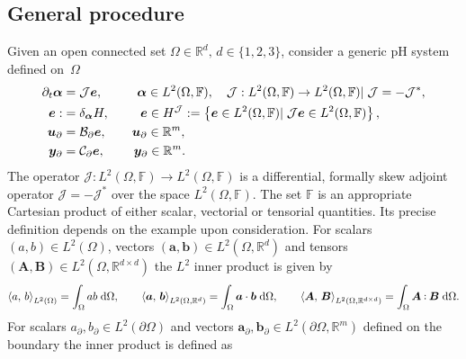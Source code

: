 \subsection{General procedure}\label{sec:pfem_gen}
Given an open connected set $\Omega \in \mathbb{R}^d,\, d \in  \{1,2,3\}$, consider a generic pH system defined on~$\Omega$
\begin{subequations}
\label{eq:pHsys_2}
\begin{align}
\partial_t {\bm{\alpha}} &= \mathcal{J}\displaystyle \bm{e}, \qquad \;\;\, \bm{\alpha} \in L^2(\Omega, \mathbb{F}), \quad \mathcal{J}: L^2(\Omega, \mathbb{F}) \rightarrow L^2(\Omega, \mathbb{F}) \vert \;  \mathcal{J} = - \mathcal{J}^*, \label{eq:pHsys_dyn} \vspace{3pt}\\
\bm{e} :&= \displaystyle \delta_{\bm{\alpha}}H, \qquad \;\, \bm{e} \in H^\mathcal{J} :=\left\{\bm{e} \in L^2(\Omega, \mathbb{F}) \vert \; \mathcal{J}\bm{e} \in L^2(\Omega, \mathbb{F})  \right\}, \label{eq:pHsys_const} \\
\bm{u}_\partial &= \mathcal{B}_\partial  \displaystyle \bm{e}, \qquad \bm{u}_\partial \in \mathbb{R}^m, \label{eq:pHsys_u} \vspace{3pt}\\
\bm{y}_\partial &= \mathcal{C}_\partial \displaystyle \bm{e}, \qquad \; \bm{y}_\partial \in \mathbb{R}^m. \label{eq:pHsys_y} \vspace{3pt}
\end{align}
\end{subequations}
The operator $\mathcal{J}: L^2(\Omega, \mathbb{F}) \rightarrow L^2(\Omega, \mathbb{F})$ is a differential, formally skew adjoint operator $\mathcal{J} = - \mathcal{J}^*$ over the space $L^2(\Omega, \mathbb{F})$. The  set $\mathbb{F}$ is an appropriate Cartesian product of either scalar, vectorial or tensorial quantities. Its precise definition depends on the example upon consideration. For scalars $(a,b) \in L^2(\Omega)$, vectors $(\bm{a}, \bm{b})\in L^2(\Omega, \mathbb{R}^d)$ and tensors  $(\bm{A}, \bm{B}) \in L^2(\Omega,\mathbb{R}^{d\times d})$ the $L^2$ inner product is given by 
\begin{equation}
\inner[L^2(\Omega)]{a}{b} = \int_{\Omega} a b \d\Omega, \qquad \inner[L^2(\Omega, \mathbb{R}^d)]{\bm{a}}{\bm{b}} = \int_{\Omega} \bm{a} \cdot \bm{b} \d\Omega, \qquad \inner[L^2(\Omega, \mathbb{R}^{d \times d})]{\bm{A}}{\bm{B}} = \int_{\Omega} \bm{A} \cddot \bm{B} \d\Omega.
\end{equation} 
For scalars ${a}_\partial, {b}_\partial \in L^2(\partial\Omega)$ and vectors  $\bm{a}_\partial, \bm{b}_\partial \in L^2(\partial\Omega, \mathbb{R}^m)$ defined on the boundary the inner product is defined as
